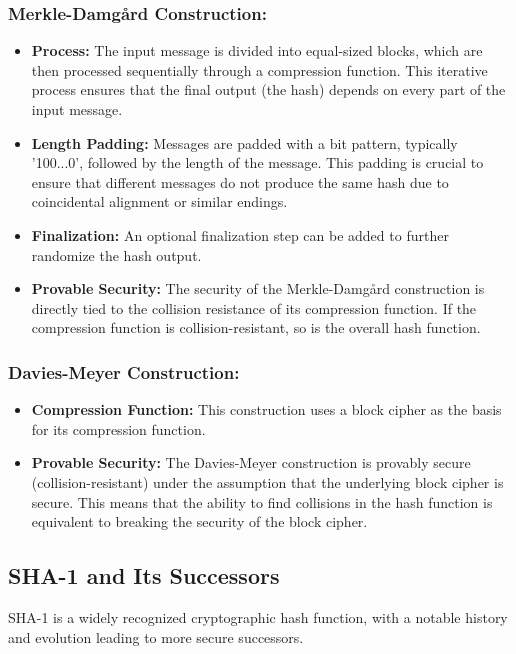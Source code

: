 \documentclass[12pt]{article}
\begin{document}
\subsubsection*{Merkle-Damgård Construction:}
\begin{itemize}
    \item \textbf{Process:} The input message is divided into equal-sized blocks, which are then processed sequentially through a compression function. This iterative process ensures that the final output (the hash) depends on every part of the input message.
    \item \textbf{Length Padding:} Messages are padded with a bit pattern, typically '100...0', followed by the length of the message. This padding is crucial to ensure that different messages do not produce the same hash due to coincidental alignment or similar endings.
    \item \textbf{Finalization:} An optional finalization step can be added to further randomize the hash output.
    \item \textbf{Provable Security:} The security of the Merkle-Damgård construction is directly tied to the collision resistance of its compression function. If the compression function is collision-resistant, so is the overall hash function.
\end{itemize}
\subsubsection*{Davies-Meyer Construction:}
\begin{itemize}
    \item \textbf{Compression Function:} This construction uses a block cipher as the basis for its compression function.
    \item \textbf{Provable Security:} The Davies-Meyer construction is provably secure (collision-resistant) under the assumption that the underlying block cipher is secure. This means that the ability to find collisions in the hash function is equivalent to breaking the security of the block cipher.
\end{itemize}

\subsection*{SHA-1 and Its Successors}

SHA-1 is a widely recognized cryptographic hash function, with a notable history and evolution leading to more secure successors.
\end{document}
